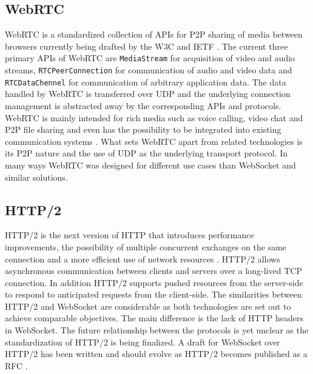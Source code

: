 \subsection{WebRTC}

WebRTC is a standardized collection of APIs for P2P sharing of media between browsers currently being drafted by the W3C and IETF \cite{bergkvist2012webrtc,alvestrand2014overview}. The current three primary APIs of WebRTC are \texttt{MediaStream} for acquisition of video and audio streams, \texttt{RTCPeerConnection} for communication of audio and video data and \texttt{RTCDataChennel} for communication of arbitrary application data. The data handled by WebRTC is transferred over UDP and the underlying connection management is abstracted away by the corresponding APIs and protocols. WebRTC is mainly intended for rich media such as voice calling, video chat and P2P file sharing and even has the possibility to be integrated into existing communication systems \cite{johnston2013taking}. What sets WebRTC apart from related technologies is its P2P nature and the use of UDP as the underlying transport protocol. In many ways WebRTC was designed for different use cases than WebSocket and similar solutions.

\subsection{HTTP/2}

HTTP/2 is the next version of HTTP that introduces performance improvements, the possibility of multiple concurrent exchanges on the same connection and a more efficient use of network resources \cite{belshe2014hypertext}. HTTP/2 allows asynchronous communication between clients and servers over a long-lived TCP connection. In addition HTTP/2 supports pushed resources from the server-side to respond to anticipated requests from the client-side. The similarities between HTTP/2 and WebSocket are considerable as both technologies are set out to achieve comparable objectives. The main difference is the lack of HTTP headers in WebSocket. The future relationship between the protocols is yet unclear as the standardization of HTTP/2 is being finalized. A draft for WebSocket over HTTP/2 has been written and should evolve as HTTP/2 becomes published as a RFC \cite{hirano2014websocketoverhttp2}.